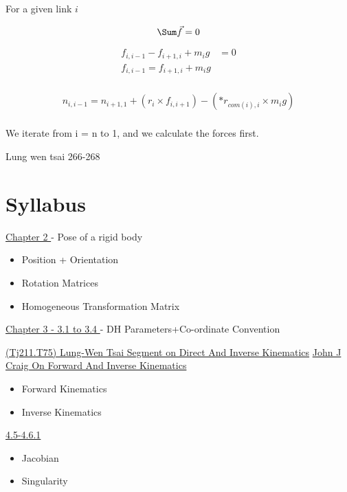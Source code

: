\documentclass[11pt]{report}
\begin{document}
For a given link \(i\)

$$\Sum \vec{f} = 0$$

\begin{align*}
f_{i,i-1} - f_{i+1,i} + m_ig &= 0 \\
f_{i,i-1} = f_{i+1,i} + m_ig  \\
\end{align*}

\begin{align*}
n_{i,i-1} = n_{i+1,1} + (r_i \times f_{i,i+1}) - (*r_{com(i),i} \times m_i g) \\
\end{align*}

We iterate from i = n to 1, and we calculate the forces first.

Lung wen tsai 266-268
\part{Syllabus}
\label{sec:org999e2a0}
\href{file:///home/adithya/university-notes/Introduction To Robotics/textbooks/Introduction-to-Robotics-Craig.pdf}{Chapter 2
}- Pose of a rigid body
\begin{itemize}
\item Position + Orientation
\end{itemize}
\begin{itemize}
\item Rotation Matrices
\item Homogeneous Transformation Matrix
\end{itemize}

\href{file:///home/adithya/university-notes/Introduction To Robotics/textbooks/Introduction-to-Robotics-Craig.pdf}{Chapter 3 - 3.1 to 3.4
}- DH Parameters+Co-ordinate Convention

\href{file:///home/adithya/university-notes/Introduction To Robotics/textbooks/(Tj211.T75) Lung-Wen Tsai - Robot Analysis_ The mechanics of serial and parallel manipulators (1999).pdf}{(Tj211.T75) Lung-Wen Tsai Segment on Direct And Inverse Kinematics}
\href{file:///home/adithya/university-notes/Introduction To Robotics/textbooks/Introduction-to-Robotics-Craig.pdf}{John J Craig On Forward And Inverse Kinematics}
\begin{itemize}
\item Forward Kinematics
\item Inverse Kinematics
\end{itemize}

\href{file:///home/adithya/university-notes/Introduction To Robotics/textbooks/(Tj211.T75) Lung-Wen Tsai - Robot Analysis_ The mechanics of serial and parallel manipulators (1999).pdf}{4.5-4.6.1}
\begin{itemize}
\item Jacobian
\item Singularity
\end{itemize}
\end{document}
